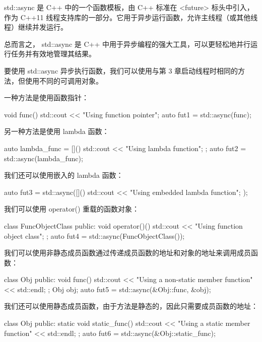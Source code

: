 
std::async 是 C++ 中的一个函数模板，由 C++ 标准在 <future> 标头中引入，作为 C++11 线程支持库的一部分。它用于异步运行函数，允许主线程（或其他线程）继续并发运行。

总而言之， std::async 是 C++ 中用于异步编程的强大工具，可以更轻松地并行运行任务并有效地管理其结果。


要使用 std::async 异步执行函数，我们可以使用与第 3 章启动线程时相同的方法，但使用不同的可调用对象。

一种方法是使用函数指针：

\begin{cpp}
void func() {
    std::cout << "Using function pointer\n";
}
auto fut1 = std::async(func);
\end{cpp}

另一种方法是使用 lambda 函数：

\begin{cpp}
auto lambda_func = []() {
    std::cout << "Using lambda function\n";
};
auto fut2 = std::async(lambda_func);
\end{cpp}

我们还可以使用嵌入的 lambda 函数：

\begin{cpp}
auto fut3 = std::async([]() {
    std::cout << "Using embedded lambda function\n";
});
\end{cpp}

我们可以使用 operator() 重载的函数对象：

\begin{cpp}
class FuncObjectClass {
    public:
    void operator()() {
        std::cout << "Using function object class\n";
    }
};
auto fut4 = std::async(FuncObjectClass());
\end{cpp}

我们可以使用非静态成员函数通过传递成员函数的地址和对象的地址来调用成员函数：

\begin{cpp}
class Obj {
    public:
    void func() {
        std::cout << "Using a non-static member function"
        << std::endl;
    }
};
Obj obj;
auto fut5 = std::async(&Obj::func, &obj);
\end{cpp}

我们还可以使用静态成员函数，由于方法是静态的，因此只需要成员函数的地址：

\begin{cpp}
class Obj {
    public:
    static void static_func() {
        std::cout << "Using a static member function"
        << std::endl;
    }
};
auto fut6 = std::async(&Obj::static_func);
\end{cpp}

